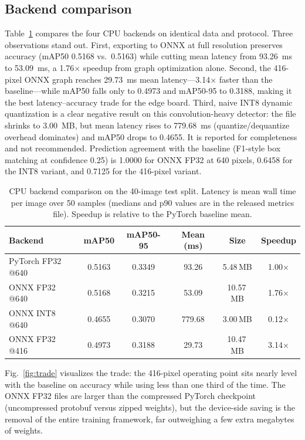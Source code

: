 \documentclass[conference]{IEEEtran}
\begin{document}
\subsection{Backend comparison}

Table~\ref{tab:backends} compares the four CPU backends on identical data and
protocol. Three observations stand out. First, exporting to ONNX at full
resolution preserves accuracy (mAP50 0.5168 vs.\ 0.5163) while cutting mean
latency from 93.26~ms to 53.09~ms, a 1.76$\times$ speedup from graph
optimization alone. Second, the 416-pixel ONNX graph reaches 29.73~ms mean
latency---3.14$\times$ faster than the baseline---while mAP50 falls only to
0.4973 and mAP50-95 to 0.3188, making it the best latency--accuracy trade for
the edge board. Third, naive INT8 dynamic quantization is a clear negative
result on this convolution-heavy detector: the file shrinks to 3.00~MB, but
mean latency rises to 779.68~ms (quantize/dequantize overhead dominates) and
mAP50 drops to 0.4655. It is reported for completeness and not recommended.
Prediction agreement with the baseline (F1-style box matching at confidence
0.25) is 1.0000 for ONNX FP32 at 640 pixels, 0.6458 for the INT8 variant, and
0.7125 for the 416-pixel variant.

\begin{table}[t]
\centering
\caption{CPU backend comparison on the 40-image test split. Latency is mean
wall time per image over 50 samples (medians and p90 values are in the
released metrics file). Speedup is relative to the PyTorch baseline mean.}
\label{tab:backends}
\begin{tabular}{|l|c|c|c|c|c|}
\hline
Backend & mAP50 & mAP50-95 & Mean (ms) & Size & Speedup \\
\hline
PyTorch FP32 @640 & 0.5163 & 0.3349 & 93.26 & 5.48\,MB & 1.00$\times$ \\
ONNX FP32 @640 & 0.5168 & 0.3215 & 53.09 & 10.57\,MB & 1.76$\times$ \\
ONNX INT8 @640 & 0.4655 & 0.3070 & 779.68 & 3.00\,MB & 0.12$\times$ \\
ONNX FP32 @416 & 0.4973 & 0.3188 & 29.73 & 10.47\,MB & 3.14$\times$ \\
\hline
\end{tabular}
\end{table}

Fig.~\ref{fig:trade} visualizes the trade: the 416-pixel operating point sits
nearly level with the baseline on accuracy while using less than one third of
the time. The ONNX FP32 files are larger than the compressed PyTorch
checkpoint (uncompressed protobuf versus zipped weights), but the device-side
saving is the removal of the entire training framework, far outweighing a few
extra megabytes of weights.
\end{document}
